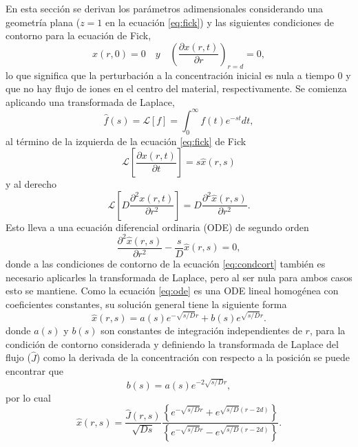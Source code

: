 En esta sección se derivan los parámetros adimensionales considerando una geometría
plana ($z = 1$ en la ecuación \ref{eq:fick}) y las siguientes condiciones de 
contorno para la ecuación de Fick,
\begin{equation}\label{eq:condcort}
    x(r, 0) = 0 \quad y \quad \left(\frac{\partial x(r, t)}{\partial r}\right)_{r=d} = 0,
\end{equation}
lo que significa que la perturbación a la concentración inicial es nula a tiempo
0 y que no hay flujo de iones en el centro del material, respectivamente. Se 
comienza aplicando una transformada de Laplace,
\begin{equation}\label{eq:laplace}
    \hat{f}(s) = \mathcal{L}[f] = \int_0^{\infty} f(t) e^{-s t} dt,
\end{equation}
al término de la izquierda de la ecuación \ref{eq:fick} de Fick 
\begin{equation}
    \mathcal{L}\left[\frac{\partial x(r, t)}{\partial t}\right] = s \hat{x}(r, s)
\end{equation}
y al derecho
\begin{equation}
    \mathcal{L}\left[D \frac{\partial^2 x(r, t)}{\partial r^2}\right] = D \frac{\partial^2 \hat{x}(r, s)}{\partial r^2}.
\end{equation}
Esto lleva a una ecuación diferencial ordinaria (ODE) de segundo orden
\begin{equation}\label{eq:ode}
    \frac{\partial^2 \hat{x}(r, s)}{\partial r^2} - \frac{s}{D} \hat{x}(r, s) = 0,
\end{equation}
donde a las condiciones de contorno de la ecuación \ref{eq:condcort} también es 
necesario aplicarles la transformada de Laplace, pero al ser nula para ambos casos
esto se mantiene. Como la ecuación \ref{eq:ode} es una ODE lineal homogénea con 
coeficientes constantes, su solución general tiene la siguiente forma
\begin{equation}
    \hat{x}(r, s) = a(s) e^{-\sqrt{s/D}r} + b(s) e^{\sqrt{s/D}r}.
\end{equation}
donde $a(s)$ y $b(s)$ son constantes de integración independientes de $r$, para 
la condición de contorno considerada y definiendo la transformada de Laplace del 
flujo ($\hat{J}$) como la derivada de la concentración con respecto a la posición
se puede encontrar que 
\begin{equation}
    b(s) = a(s) e^{-2 \sqrt{s/D} r},
\end{equation}
por lo cual 
\begin{equation}
    \hat{x}(r, s) = \frac{\hat{J}(r, s)}{\sqrt{D s}} \frac{\left\{ e^{-\sqrt{s/D}r} + e^{\sqrt{s/D}(r - 2d)} \right\}}{\left\{ e^{-\sqrt{s/D}r} - e^{\sqrt{s/D}(r - 2d)} \right\}}.
\end{equation}

